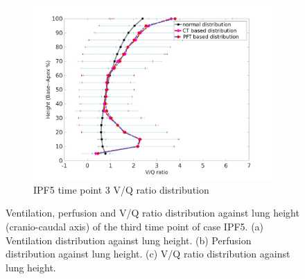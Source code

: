 \begin{figure}[htbp]
\begin{subfigure}{.6\linewidth}
  \includegraphics[width=\linewidth,trim={{.0\wd0} {.0\wd0} {.0\wd0} {.0\wd0}},clip]{Appendix/Image_AppexB/IPF513/IPF513_VQAgainstLungHeight.png}
  \caption{IPF5 time point 3 V/Q ratio distribution}
  \label{fig:IPF513VQDistribution-c}
\end{subfigure}
\caption{ Ventilation, perfusion and V/Q ratio distribution against lung height (cranio-caudal axis) of the third time point of case IPF5. (a) Ventilation distribution against lung height. (b) Perfusion distribution against lung height. (c) V/Q ratio distribution against lung height.}
\label{fig:IPF513VQDistribution}
\end{figure}

